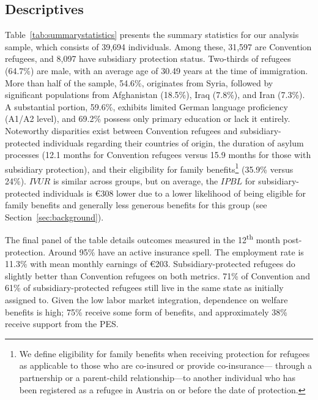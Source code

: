 \FloatBarrier


\subsection{Descriptives}

Table~\ref{tab:summarystatistics} presents the summary statistics for our analysis sample, which consists of 39,694 individuals. Among these, 31,597 are Convention refugees, and 8,097 have subsidiary protection status. Two-thirds of refugees (64.7\%) are male, with an average age of 30.49 years at the time of immigration. More than half of the sample, 54.6\%, originates from Syria, followed by significant populations from Afghanistan (18.5\%), Iraq (7.8\%), and Iran (7.3\%). A substantial portion, 59.6\%, exhibits limited German language proficiency (A1/A2 level), and 69.2\% possess only primary education or lack it entirely. Noteworthy disparities exist between Convention refugees and subsidiary-protected individuals regarding their countries of origin, the duration of asylum processes (12.1 months for Convention refugees versus 15.9 months for those with subsidiary protection), and their eligibility for family benefits\footnote{We define eligibility for family benefits when receiving protection for refugees as applicable to those who are co-insured or provide co-insurance--- through a partnership or a parent-child relationship---to another individual who has been registered as a refugee in Austria on or before the date of protection.} (35.9\% versus 24\%). $IVUR$ is similar across groups, but on average, the $IPBL$ for subsidiary-protected individuals is €308 lower due to a lower likelihood of being eligible for family benefits and generally less generous benefits for this group (see Section~\ref{sec:background}).

The final panel of the table details outcomes measured in the 12\textsuperscript{th} month post-protection. Around 95\% have an active insurance spell. The employment rate is 11.3\% with mean monthly earnings of €203. Subsidiary-protected refugees do slightly better than Convention refugees on both metrics. 71\% of Convention and 61\% of subsidiary-protected refugees still live in the same state as initially assigned to. Given the low labor market integration, dependence on welfare benefits is high; 75\% receive some form of benefits, and approximately 38\% receive support from the PES.

